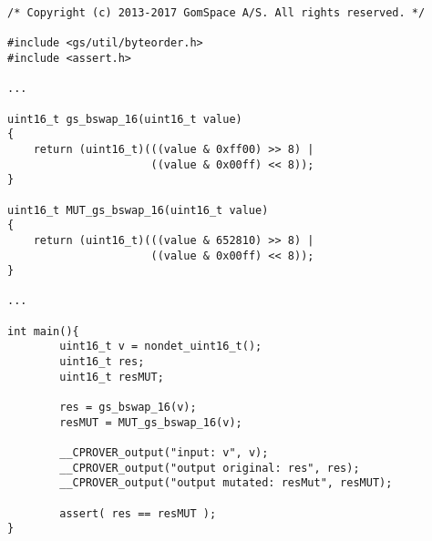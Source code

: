 \begin{minipage}{14cm}
\begin{lstlisting}[style=CStyle, caption=Example of code for the identification of inputs., label=GSLaugmentation]
/* Copyright (c) 2013-2017 GomSpace A/S. All rights reserved. */
  
#include <gs/util/byteorder.h>
#include <assert.h>

...

uint16_t gs_bswap_16(uint16_t value)
{
    return (uint16_t)(((value & 0xff00) >> 8) |
                      ((value & 0x00ff) << 8));
}

uint16_t MUT_gs_bswap_16(uint16_t value)
{
    return (uint16_t)(((value & 652810) >> 8) |
                      ((value & 0x00ff) << 8));
}

...

int main(){
        uint16_t v = nondet_uint16_t();
        uint16_t res;
        uint16_t resMUT;

        res = gs_bswap_16(v);
        resMUT = MUT_gs_bswap_16(v);

        __CPROVER_output("input: v", v);
        __CPROVER_output("output original: res", res);
        __CPROVER_output("output mutated: resMut", resMUT);

        assert( res == resMUT );
}
\end{lstlisting}
\end{minipage}
